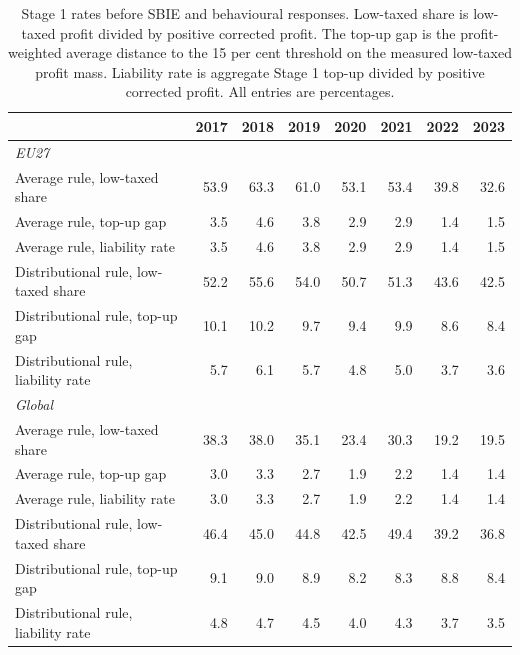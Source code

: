 \begin{table}[H]
\centering
\small
\setlength{\tabcolsep}{4pt}
\caption[Stage 1 rates, EU27 and global]{Stage 1 rates before SBIE and behavioural responses. Low-taxed share is low-taxed profit divided by positive corrected profit. The top-up gap is the profit-weighted average distance to the 15 per cent threshold on the measured low-taxed profit mass. Liability rate is aggregate Stage 1 top-up divided by positive corrected profit. All entries are percentages.}
\label{tab:stage1_rates_updated}
\begin{tabular}{@{}lrrrrrrr@{}}
\toprule
 & 2017 & 2018 & 2019 & 2020 & 2021 & 2022 & 2023 \\
\midrule
\multicolumn{8}{l}{\textit{EU27}} \\
Average rule, low-taxed share & 53.9 & 63.3 & 61.0 & 53.1 & 53.4 & 39.8 & 32.6 \\
Average rule, top-up gap & 3.5 & 4.6 & 3.8 & 2.9 & 2.9 & 1.4 & 1.5 \\
Average rule, liability rate & 3.5 & 4.6 & 3.8 & 2.9 & 2.9 & 1.4 & 1.5 \\
Distributional rule, low-taxed share & 52.2 & 55.6 & 54.0 & 50.7 & 51.3 & 43.6 & 42.5 \\
Distributional rule, top-up gap & 10.1 & 10.2 &  9.7 &  9.4 &  9.9 &  8.6 &  8.4 \\
Distributional rule, liability rate & 5.7 & 6.1 & 5.7 & 4.8 & 5.0 & 3.7 & 3.6 \\
\multicolumn{8}{l}{\textit{Global}} \\
Average rule, low-taxed share & 38.3 & 38.0 & 35.1 & 23.4 & 30.3 & 19.2 & 19.5 \\
Average rule, top-up gap & 3.0 & 3.3 & 2.7 & 1.9 & 2.2 & 1.4 & 1.4 \\
Average rule, liability rate & 3.0 & 3.3 & 2.7 & 1.9 & 2.2 & 1.4 & 1.4 \\
Distributional rule, low-taxed share & 46.4 & 45.0 & 44.8 & 42.5 & 49.4 & 39.2 & 36.8 \\
Distributional rule, top-up gap & 9.1 & 9.0 & 8.9 & 8.2 & 8.3 & 8.8 & 8.4 \\
Distributional rule, liability rate & 4.8 & 4.7 & 4.5 & 4.0 & 4.3 & 3.7 & 3.5 \\
\bottomrule
\end{tabular}
\end{table}
